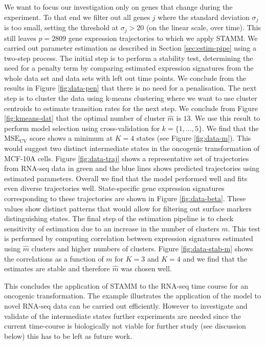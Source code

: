 We want to focus our investigation only on genes that change during the experiment. To that end we filter out all genes $j$ where the standard deviation $\sigma_j$ is too small, setting the threshold at $\sigma_j > 20$ (on the linear scale, over time). This still leaves $p=2809$ gene expression trajectories to which we apply STAMM. We carried out parameter estimation as described in Section \ref{sec:estim-pipe} using a two-step process. The initial step is to perform a stability test, determining the need for a penalty term by comparing estimated expression signatures from the whole data set and data sets with left out time points. We conclude from the results in Figure \ref{fig:data-pen} that there is no need for a penalisation. The next step is to cluster the data using k-means clustering where we want to use cluster centroids to estimate transition rates for the next step. We conclude from Figure \ref{fig:kmeans-dat} that the optimal number of cluster  $\hat{m}$ is $13$. We use this result to perform model selection using cross-validation for $k=\lbrace 1, \ldots, 5\rbrace$. We find that the $\mathrm{MSE_{CV}}$ score shows a minimum at $K=4$ states (see Figure \ref{fig:data-m}). This would suggest two distinct intermediate states in the oncogenic transformation of MCF-10A cells. Figure \ref{fig:data-traj} shows a representative set of trajectories from RNA-seq data in green and the blue lines shows predicted trajectories using estimated parameters. Overall we find that the model performed well and fits even diverse trajectories well. State-specific gene expression signatures corresponding to these trajectories are shown in Figure \ref{fig:data-beta}. These values show distinct patterns that would allow for filtering out surface markers distinguishing states. The final step of the estimation pipeline is to check sensitivity of estimation due to an increase in the number of clusters $m$. This test is performed by computing correlation between expression signatures estimated using $\hat{m}$ clusters and higher numbers of clusters. Figure \ref{fig:data-stab-m} shows the correlations as a function of $m$ for $K=3$ and $K=4$ and we find that the estimates are stable and therefore $\hat{m}$ was chosen well.

This concludes the application of STAMM to the RNA-seq time course for an oncogenic transformation. The example illustrates the application of the model to novel RNA-seq data can be carried out efficiently. However to investigate and validate of the intermediate states further experiments are needed since the current time-course is biologically not viable for further study (see discussion below) this has to be left as future work.

